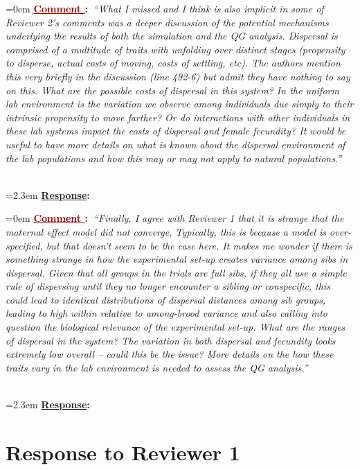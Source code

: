 \documentclass[12pt]{article}
\newcounter{cN}
\newcommand{\comment}[1]{
	\vspace{2em}
	\refstepcounter{cN} %
	\noindent \hangindent=0em \textbf{\textcolor{Maroon}{\uline{Comment \thecN}:~}}\emph{``#1''}
	}
\newcommand{\response}[1]{
	\\[0.25em]
	\hangindent=2.3em \textbf{\textcolor{NavyBlue}{\uline{Response}:~}}#1
	}
\begin{document}
\comment{What I missed and I think is also implicit in some of Reviewer 2’s comments was a deeper discussion of the potential mechanisms underlying the results of both the simulation and the QG analysis.
Dispersal is comprised of a multitude of traits with unfolding over distinct stages (propensity to disperse, actual costs of moving, costs of settling, etc).
The authors mention this very briefly in the discussion (line 492-6) but admit they have nothing to say on this.
What are the possible costs of dispersal in this system?
In the uniform lab environment is the variation we observe among individuals due simply to their intrinsic propensity to move farther?
Or do interactions with other individuals in these lab systems impact the costs of dispersal and female fecundity?
It would be useful to have more details on what is known about the dispersal environment of the lab populations and how this may or may not apply to natural populations.}
\response{}

\comment{Finally, I agree with Reviewer 1 that it is strange that the maternal effect model did not converge.
Typically, this is because a model is over-specified, but that doesn’t seem to be the case here.
It makes me wonder if there is something strange in how the experimental set-up creates variance among sibs in dispersal.
Given that all groups in the trials are full sibs, if they all use a simple rule of dispersing until they no longer encounter a sibling or conspecific, this could lead to identical distributions of dispersal distances among sib groups, leading to high within relative to among-brood variance and also calling into question the biological relevance of the experimental set-up.
What are the ranges of dispersal in the system? The variation in both dispersal and fecundity looks extremely low overall – could this be the issue?
More details on the how these traits vary in the lab environment is needed to assess the QG analysis.}
\response{}

\section{Response to Reviewer 1}
\vspace{-2em}
\end{document}

